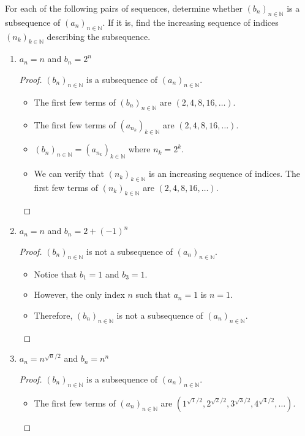 \documentclass[10pt]{article}
\newcommand{\N}{\mathbb{N}}
\newenvironment{problem}[2][Problem]{\begin{trivlist}
\item[\hskip \labelsep {\bfseries #1}\hskip \labelsep {\bfseries #2.}]}{\end{trivlist}}
\begin{document}
\newpage
\begin{problem}{2}
	For each of the following pairs of sequences, determine whether $ (b_n)_{n\in\N} $ is a subsequence of $ (a_n)_{n\in\N} $. If it is, find the increasing sequence of indices $ (n_k)_{k \in \N} $ describing the subsequence.
	\begin{enumerate}
		\item $ a_n=n $ and $ b_n=2^n $
            \begin{proof}
                $(b_n)_{n\in\N}$ is a subsequence of $(a_n)_{n\in\N}$.
                \begin{itemize}
                    \item The first few terms of $(b_n)_{n\in\N}$ are $(2, 4, 8, 16, \ldots)$.
                    \item The first few terms of $(a_{n_k})_{k\in\N}$ are $(2, 4, 8, 16, \ldots)$.
                    \item $(b_n)_{n\in\N} = (a_{n_k})_{k\in\N}$ where $n_k = 2^k$.
                    \item We can verify that $(n_k)_{k\in\N}$ is an increasing sequence of indices. The first few terms of $(n_k)_{k\in\N}$ are $(2, 4, 8, 16, \ldots)$.
                \end{itemize}
            \end{proof}
		\item $ a_n=n $ and $ b_n=2+(-1)^n $
            \begin{proof}
                $(b_n)_{n\in\N}$ is not a subsequence of $(a_n)_{n\in\N}$.
                \begin{itemize}
                    \item Notice that $b_1 = 1$ and $b_3 = 1$.
                    \item However, the only index $n$ such that $a_n = 1$ is $n = 1$.
                    \item Therefore, $(b_n)_{n\in\N}$ is not a subsequence of $(a_n)_{n\in\N}$.
                \end{itemize}
            \end{proof}
		\item $ a_n=n^{\sqrt{n}/2} $ and $ b_n=n^n $
            \begin{proof}
                $(b_n)_{n\in\N}$ is a subsequence of $(a_n)_{n\in\N}$.
                \begin{itemize}
                    \item The first few terms of $(a_n)_{n\in\N}$ are $(1^{\sqrt{1}/2}, 2^{\sqrt{2}/2}, 3^{\sqrt{3}/2}, 4^{\sqrt{4}/2}, \ldots)$.

\end{itemize}
\end{proof}
\end{enumerate}
\end{problem}
\end{document}
